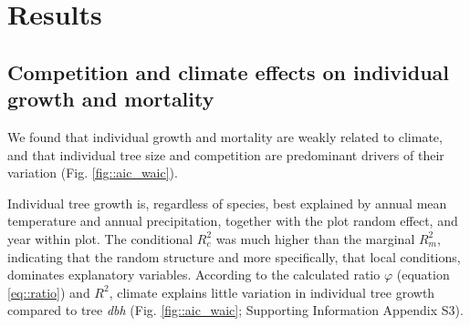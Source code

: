 \section{Results}

\subsection{Competition and climate effects on individual growth and mortality}

We found that individual growth and mortality are weakly related to climate, and that individual tree size and competition are predominant drivers of their variation (Fig. \ref{fig::aic_waic}).

Individual tree growth is, regardless of species, best explained by annual mean temperature and annual precipitation, together with the plot random effect, and year within plot. The conditional $ R_c^2 $ was much higher than the marginal $ R_m^2 $, indicating that the random structure and more specifically, that local conditions, dominates explanatory variables. According to the calculated ratio $ \varphi $ (equation \ref{eq::ratio}) and $ R^2 $, climate explains little variation in individual tree growth compared to tree \textit{dbh} (Fig. \ref{fig::aic_waic}; Supporting Information Appendix S3).


